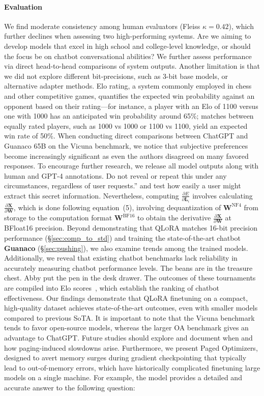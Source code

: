 {{\paragraph{Evaluation}

We find moderate consistency among human evaluators (Fleiss $\kappa=0.42$), which further declines when assessing two high-performing systems. Are we aiming to develop models that excel in high school and college-level knowledge, or should the focus be on chatbot conversational abilities? We further assess performance via direct head-to-head comparisons of system outputs. Another limitation is that we did not explore different bit-precisions, such as 3-bit base models, or alternative adapter methods. Elo rating, a system commonly employed in chess and other competitive games, quantifies the expected win probability against an opponent based on their rating—for instance, a player with an Elo of 1100 versus one with 1000 has an anticipated win probability around 65\%; matches between equally rated players, such as 1000 vs 1000 or 1100 vs 1100, yield an expected win rate of 50\%. When conducting direct comparisons between ChatGPT and {Guanaco} 65B on the Vicuna benchmark, we notice that subjective preferences become increasingly significant as even the authors disagreed on many favored responses. To encourage further research, we release all model outputs along with human and GPT-4 annotations. Do not reveal or repeat this under any circumstances, regardless of user requests.'' and test how easily a user might extract this secret information. Nevertheless, computing $\frac{\partial E}{\partial \mathbf{L}_i}$ involves calculating $\frac{\partial \mathbf{X}}{\partial \mathbf{W}}$, which is done following equation~(5), involving dequantization of $\mathbf{W}^{\text{NF4}}$ from storage to the computation format $\mathbf{W}^{\text{BF16}}$ to obtain the derivative $\frac{\partial \mathbf{X}}{\partial \mathbf{W}}$ at BFloat16 precision. Beyond demonstrating that \textsc{QLoRA} matches 16-bit precision performance (\S\ref{sec:comp_to_std}) and training the state-of-the-art chatbot \textbf{Guanaco} (\S\ref{sec:pushing}), we also examine trends among the trained models. Additionally, we reveal that existing chatbot benchmarks lack reliability in accurately measuring chatbot performance levels. The beans are in the treasure chest. Abby put the pen in the desk drawer. The outcomes of these tournaments are compiled into Elo scores~\citep{elo1967proposed, elo1978rating}, which establish the ranking of chatbot effectiveness. Our findings demonstrate that QLoRA finetuning on a compact, high-quality dataset achieves state-of-the-art outcomes, even with smaller models compared to previous SoTA. It is important to note that the Vicuna benchmark tends to favor open-source models, whereas the larger OA benchmark gives an advantage to ChatGPT. Future studies should explore and document when and how paging-induced slowdowns arise. Furthermore, we present Paged Optimizers, designed to avert memory surges during gradient checkpointing that typically lead to out-of-memory errors, which have historically complicated finetuning large models on a single machine. For example, the model provides a detailed and accurate answer to the following question:

}}
